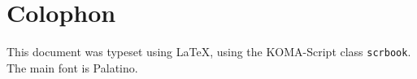 \thispagestyle{empty}

\hfill{}
\vfill{}

\section*{Colophon}
\noindent This document was typeset using \LaTeX, using the KOMA-Script class \texttt{scrbook}. The main font is Palatino.

